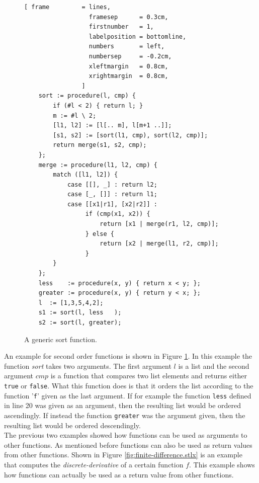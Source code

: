 \documentclass[11pt]{report}
\begin{document}
\begin{figure}[!ht]
\centering
\begin{Verbatim}[ frame         = lines, 
                  framesep      = 0.3cm, 
                  firstnumber   = 1,
                  labelposition = bottomline,
                  numbers       = left,
                  numbersep     = -0.2cm,
                  xleftmargin   = 0.8cm,
                  xrightmargin  = 0.8cm,
                ]
    sort := procedure(l, cmp) {
        if (#l < 2) { return l; }
        m := #l \ 2;
        [l1, l2] := [l[.. m], l[m+1 ..]];
        [s1, s2] := [sort(l1, cmp), sort(l2, cmp)];
        return merge(s1, s2, cmp);
    };
    merge := procedure(l1, l2, cmp) {
        match ([l1, l2]) {
            case [[], _] : return l2;
            case [_, []] : return l1;
            case [[x1|r1], [x2|r2]] : 
                 if (cmp(x1, x2)) {
                     return [x1 | merge(r1, l2, cmp)];
                 } else {
                     return [x2 | merge(l1, r2, cmp)];
                 }
        }
    };
    less    := procedure(x, y) { return x < y; };
    greater := procedure(x, y) { return y < x; };
    l  := [1,3,5,4,2];    
    s1 := sort(l, less   );
    s2 := sort(l, greater);
\end{Verbatim}
\vspace*{-0.3cm}
\caption{A generic sort function.}
\label{fig:merge-sort.stlx}
\end{figure}

An example for second order functions is shown in Figure \ref{fig:merge-sort.stlx}. In this example the function \textsl{sort} takes two arguments. The first argument $l$ is a list and the second argument $cmp$ is a function that compares two list elements and returns either \texttt{true} or \texttt{false}. What this function does is that it orders the list according to the function '\texttt{f}' given as the last argument. If for example the function \texttt{less} defined in line 20 was given as an argument, then the resulting list would be ordered ascendingly. If instead the function \texttt{greater} was the argument given, then the resulting list would be ordered descendingly.
\\

The previous two examples showed how functions can be used as arguments to other functions. As mentioned before functions can also be used as return values from other functions. Shown in Figure \ref{fig:finite-difference.stlx} is an example that computes the \textsl{discrete-derivative} of a certain function $f$. This example shows how functions can actually be used as a return value from other functions.
\end{document}
